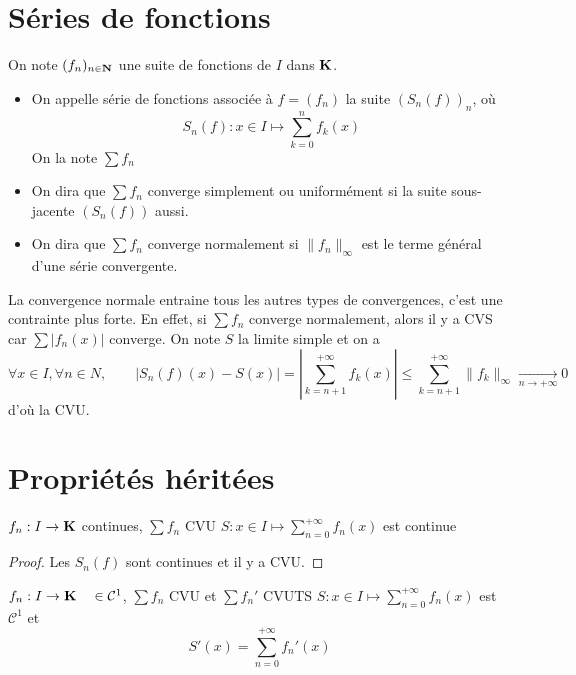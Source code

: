 \section{Séries de fonctions}

\begin{dfn}
    On note $(f_n)_{n \in  \mathbf N}$ une suite de fonctions de $I$ dans  $\mathbf K$. \begin{itemize}
        \item On appelle série de fonctions associée à $f=(f_n)$ la suite  $(S_n(f))_n$, où \[
                S_n(f): x \in  I \longmapsto  \sum_{k=0}^nf_k(x)
        \] 
        On la note $\sum f_n$
    \item On dira que  $\sum f_n$ converge simplement ou uniformément si la suite sous-jacente $(S_n(f))$ aussi. 
    \item On dira que $\sum f_n$ converge normalement si  $\|f_n\|_\infty$ est le terme général d'une série convergente.
    \end{itemize}
\end{dfn}

\begin{rem}
    La convergence normale entraine tous les autres types de convergences, c'est une contrainte plus forte. En effet, si $\sum f_n$ converge normalement, alors il y a CVS car $\sum |f_n(x)|$ converge. On note  $S$ la limite simple et on a\[
        \forall  x \in  I, \forall  n \in  N, \qquad  \left| S_n(f)(x) -S(x)\right|= \left| \sum_{k=n+1}^{+\infty} f_k(x) \right|\leq \sum_{k=n+1}^{+\infty} \|f_k\|_\infty \xrightarrow[n\to+\infty]{}0
\] 
d'où la CVU.
\end{rem}

\section{Propriétés héritées}

\begin{prop}
\Hyp $f_n:I\to \mathbf K$ continues, $\sum f_n$ CVU
\Conc  $\displaystyle S:x \in  I \longmapsto  \sum_{n=0}^{+\infty}f_n(x)$ est continue
\end{prop}

\begin{proof}
    Les $S_n(f)$ sont continues et il y a CVU.
\end{proof}

\begin{prop}[Dérivation]
    \Hyp $f_n:I\to \mathbf K \quad  \in \mathcal  C^1$, $\sum f_n$ CVU et  $\sum f_n'$ CVUTS
    \Conc  $\displaystyle S:x \in  I \longmapsto  \sum_{n=0}^{+\infty}f_n(x)$ est $\mathcal  C^1$ et \[
        S'(x)= \sum_{n=0}^{+\infty} f_n'(x)
    \] 
\end{prop}

